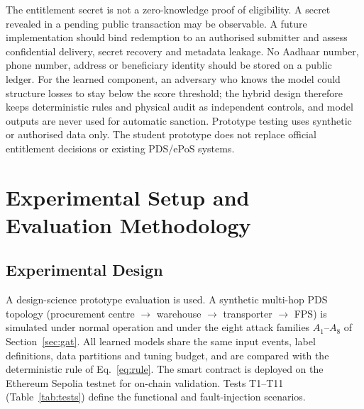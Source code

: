 \documentclass[conference,a4paper]{IEEEtran}
\begin{document}
The entitlement secret is not a zero-knowledge proof of eligibility. A secret revealed in a pending public transaction may be observable. A future implementation should bind redemption to an authorised submitter and assess confidential delivery, secret recovery and metadata leakage. No Aadhaar number, phone number, address or beneficiary identity should be stored on a public ledger. For the learned component, an adversary who knows the model could structure losses to stay below the score threshold; the hybrid design therefore keeps deterministic rules and physical audit as independent controls, and model outputs are never used for automatic sanction. Prototype testing uses synthetic or authorised data only. The student prototype does not replace official entitlement decisions or existing PDS/ePoS systems.

\section{Experimental Setup and Evaluation Methodology}
\subsection{Experimental Design}
A design-science prototype evaluation is used. A synthetic multi-hop PDS topology (procurement centre $\to$ warehouse $\to$ transporter $\to$ FPS) is simulated under normal operation and under the eight attack families $A_1$--$A_8$ of Section~\ref{sec:gat}. All learned models share the same input events, label definitions, data partitions and tuning budget, and are compared with the deterministic rule of Eq.~\eqref{eq:rule}. The smart contract is deployed on the Ethereum Sepolia testnet for on-chain validation. Tests T1--T11 (Table~\ref{tab:tests}) define the functional and fault-injection scenarios.
\end{document}
